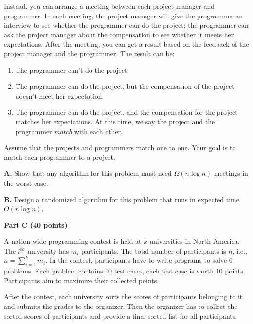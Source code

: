 \documentclass{article}
\begin{document}
Instead, you can arrange a meeting between each project manager and
programmer.  In each meeting, the project manager will give the
programmer an interview to see whether the programmer can do the
project; the programmer can ask the project manager about the
compensation to see whether it meets her expectations.  After the
meeting, you can get a result based on the feedback of the project
manager and the programmer.  The result can be:

\begin{enumerate}
  \item The programmer can't do the project.
  \item The programmer can do the project, but the compensation of the
    project doesn't meet her expectation.
  \item The programmer can do the project, and the compensation for
    the project matches her expectations. At this time, we say the
    project and the programmer \textit{match} with each other.
\end{enumerate}

Assume that the projects and programmers match one to one. Your goal
is to match each programmer to a project.

{\bf A.} Show that any algorithm for this problem must need $\Omega( n
\log{n} )$ meetings in the worst case.

{\bf B.}  Design a randomized algorithm for this problem that runs in
expected time $O ( n \log{n} )$.

\newpage

\begin{center}
{\bf Part C (40 points)}
\end{center}


 A nation-wide programming contest is held
at $k$ universities in North America. The $i^{th}$ university has
$m_{i}$ participants. The total number of participants is $n$, i.e.,
$n = \sum_{i=1}^{k}m_{i}$. In the contest, participants have to write
programs to solve 6 problems. Each problem contains 10 test cases,
each test case is worth 10 points. Participants aim to maximize their
collected points. 

After the contest, each university sorts the scores of participants
belonging to it and submits the grades to the organizer.  Then the
organizer has to collect the sorted scores of participants and provide
a final sorted list for all participants.
\end{document}
